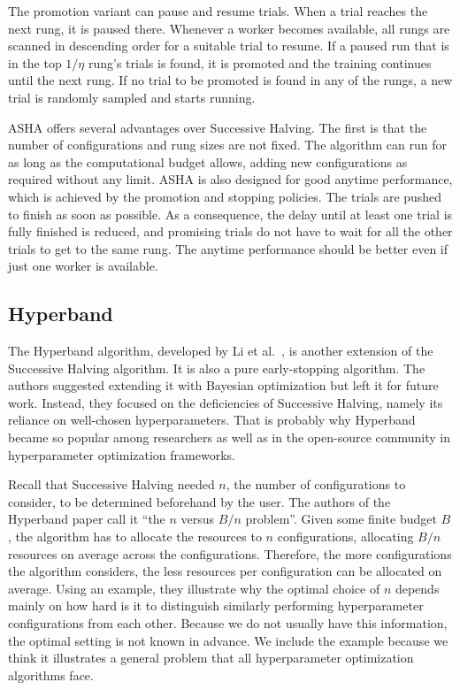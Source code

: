  The promotion variant can pause and resume trials. When a trial reaches the next rung, it is paused there. Whenever a worker becomes available, all rungs are scanned in descending order for a suitable trial to resume. If a paused run that is in the top $1/\eta$ rung's trials is found, it is promoted and the training continues until the next rung. If no trial to be promoted is found in any of the rungs, a new trial is randomly sampled and starts running.

 ASHA offers several advantages over Successive Halving. The first is that the number of configurations and rung sizes are not fixed. The algorithm can run for as long as the computational budget allows, adding new configurations as required without any limit. ASHA is also designed for good anytime performance, which is achieved by the promotion and stopping policies. The trials are pushed to finish as soon as possible. As a consequence, the delay until at least one trial is fully finished is reduced, and promising trials do not have to wait for all the other trials to get to the same rung. The anytime performance should be better even if just one worker is available.


\subsection{Hyperband}
The Hyperband algorithm, developed by Li et al.~\cite{li2018hyperband}, is another extension of the Successive Halving algorithm. It is also a pure early-stopping algorithm. The authors suggested extending it with Bayesian optimization but left it for future work. Instead, they focused on the deficiencies of Successive Halving, namely its reliance on well-chosen hyperparameters. That is probably why Hyperband became so popular among researchers as well as in the open-source community in hyperparameter optimization frameworks.

Recall that Successive Halving needed $n$, the number of configurations to consider, to be determined beforehand by the user. The authors of the Hyperband paper call it ``the $n$ versus $B/n$ problem''. Given some finite budget $B$, the algorithm has to allocate the resources to $n$ configurations, allocating $B/n$ resources on average across the configurations. Therefore, the more configurations the algorithm considers, the less resources per configuration can be allocated on average. Using an example, they illustrate why the optimal choice of $n$ depends mainly on how hard is it to distinguish similarly performing hyperparameter configurations from each other. Because we do not usually have this information, the optimal setting is not known in advance. We include the example because we think it illustrates a general problem that all hyperparameter optimization algorithms face.

